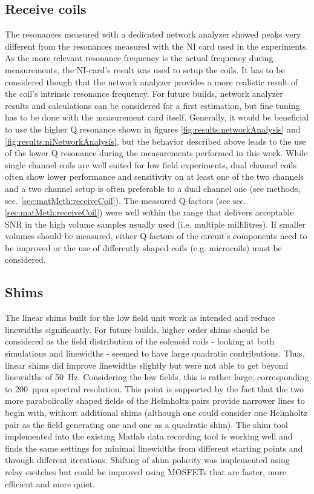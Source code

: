         \subsection{Receive coils}
            The resonances measured with a dedicated network analyzer showed peaks very different from the resonances measured with the NI card used in the experiments. As the more relevant resonance frequency is the actual frequency during measurements, the NI-card's result was used to setup the coils. It has to be considered though that the network analyzer provides a more realistic result of the coil's intrinsic resonance frequency. For future builds, network analyzer results and calculations can be considered for a first estimation, but fine tuning has to be done with the measurement card itself. Generally, it would be beneficial to use the higher Q resonance shown in figures \ref{fig:results:networkAnalysis} and \ref{fig:results:niNetworkAnalysis}, but the behavior described above leads to the use of the lower Q resonance during the measurements performed in this work.
            While single channel coils are well suited for low field experiments, dual channel coils often show lower performance and sensitivity on at least one of the two channels and a two channel setup is often preferable to a dual channel one (see methods, sec. \ref{sec:matMeth:receiveCoil}). The measured Q-factors (see sec. \ref{sec:matMeth:receiveCoil}) were well within the range that delivers acceptable SNR in the high volume samples usually used (i.e. multiple millilitres). If smaller volumes should be measured, either Q-factors of the circuit's components need to be improved or the use of differently shaped coils (e.g. microcoils) must be considered.
        \subsection{Shims}
            The linear shims built for the low field unit work as intended and reduce linewidths significantly. For future builds, higher order shims should be considered as the field distribution of the solenoid coils - looking at both simulations and linewidths - seemed to have large quadratic contributions. Thus, linear shims did improve linewidths slightly but were not able to get beyond linewidths of \SI{50}{\hertz}. Considering the low fields, this is rather large, corresponding to 200~ppm spectral resolution. This point is supported by the fact that the two more parabolically shaped fields of the Helmholtz pairs provide narrower lines to begin with, without additional shims (although one could consider one Helmholtz pair as the field generating one and one as a quadratic shim). The shim tool implemented into the existing Matlab data recording tool is working well and finds the same settings for minimal linewidths from different starting points and through different iterations. Shifting of shim polarity was implemented using relay switches but could be improved using MOSFETs that are faster, more efficient and more quiet.
